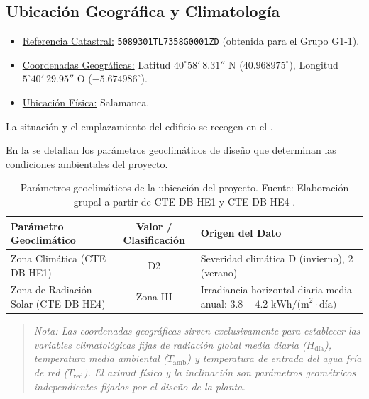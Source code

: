 \documentclass[12pt]{article}
\begin{document}
\subsection{Ubicación Geográfica y Climatología}
\label{subsec:ubicacion_y_climatologia}

\begin{itemize}
    \item \uline{Referencia Catastral:} \texttt{5089301TL7358G0001ZD} (obtenida para el Grupo G1-1).
    \item \uline{Coordenadas Geográficas:} Latitud $40^\circ 58'\ 8.31''\text{ N}$ ($40.968975^\circ$), Longitud $5^\circ 40'\ 29.95''\text{ O}$ ($-5.674986^\circ$).
    \item \uline{Ubicación Física:} Salamanca.
\end{itemize}

La situación y el emplazamiento del edificio se recogen en el .

En la  se detallan los parámetros geoclimáticos de diseño que determinan las condiciones ambientales del proyecto.

\begin{table}[H]
\centering
\caption{Parámetros geoclimáticos de la ubicación del proyecto. Fuente: Elaboración grupal a partir de CTE DB-HE1 y CTE DB-HE4 \cite{cte_he4}.}
\label{tab:parametros_geoclimaticos}
\begin{tabularx}{\textwidth}{p{5.5cm}cX}
\toprule
\textbf{Parámetro Geoclimático} & \textbf{Valor / Clasificación} & \textbf{Origen del Dato} \\
\midrule
Zona Climática (CTE DB-HE1) & D2 & Severidad climática D (invierno), 2 (verano) \\
Zona de Radiación Solar (CTE DB-HE4) & Zona III & Irradiancia horizontal diaria media anual: $3.8 - 4.2 \text{ kWh/(m}^2\cdot\text{día)}$ \\
\bottomrule
\end{tabularx}
\end{table}

\begin{quote}
\itshape
Nota: Las coordenadas geográficas sirven exclusivamente para establecer las variables climatológicas fijas de radiación global media diaria ($H_{\text{día}}$), temperatura media ambiental ($T_{\text{amb}}$) y temperatura de entrada del agua fría de red ($T_{\text{red}}$). El azimut físico y la inclinación son parámetros geométricos independientes fijados por el diseño de la planta.
\end{quote}
\end{document}
